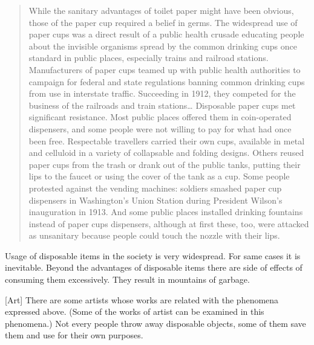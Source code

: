 \begin{quote}
While the sanitary advantages of toilet paper might have been obvious, those of the paper cup required a belief in germs. The widespread use of paper cups was a direct result of a public health crusade educating people about the invisible organisms spread by the common drinking cups once standard in public places, especially trains and railroad stations. Manufacturers of paper cups teamed up with public health authorities to campaign for federal and state regulations banning common drinking cups from use in interstate traffic. Succeeding in 1912, they competed for the business of the railroads and train stations\ldots
Disposable paper cups met significant resistance. Most public places offered them in coin-operated dispensers, and some people were not willing to pay for what had once been free. Respectable travellers carried their own cups, available in metal and celluloid in a variety of collapsable and folding designs. Others reused paper cups from the trash or drank out of the public tanks, putting their lips to the faucet or using the cover of the tank as a cup. Some people protested against the vending machines: soldiers smashed paper cup dispensers in Washington’s Union Station during President Wilson’s inauguration in 1913. And some public places installed drinking fountains instead of paper cups dispensers, although at first these, too, were attacked as unsanitary because people could touch the nozzle with their lips.
\end{quote}

Usage of disposable items in the society is very widespread. For same cases it is inevitable. Beyond the advantages of disposable items there are side of effects of consuming them excessively. They result in mountains of garbage.

 





%
%
[Art] There are some artists whose works are related with the phenomena expressed above. (Some of the works of artist can be examined in this phenomena.) Not every people throw away disposable objects, some of them save them and use for their own purposes. 


